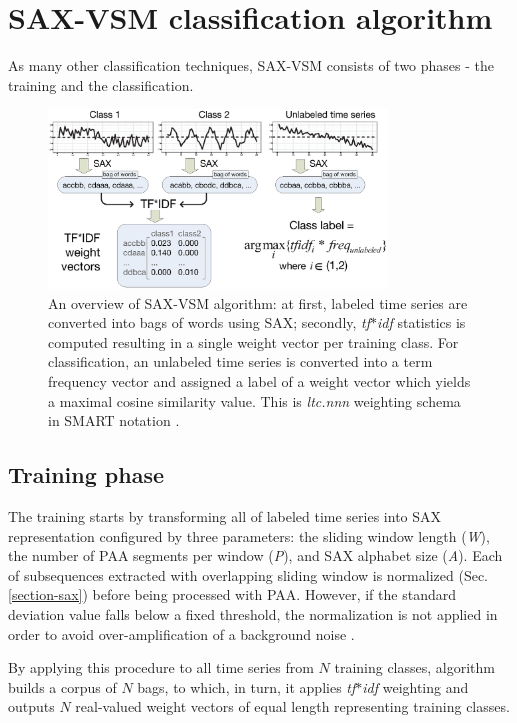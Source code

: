 \documentclass[conference]{IEEEtran}
\begin{document}
\vspace{0.1cm}
\section{SAX-VSM classification algorithm} \label{sax-vsm}
As many other classification techniques, SAX-VSM consists of two phases - 
the training and the classification. 

\begin{figure}[t]
   \centering
   \vspace{-0.05cm}
   \includegraphics[width=90mm]{figures/overview.eps}
   \caption{
   An overview of SAX-VSM algorithm: 
   at first, labeled time series are converted into bags of words using SAX; 
   secondly, \textit{tf$\ast$idf} statistics is computed resulting in 
   a single weight vector per training class. For classification, an unlabeled 
   time series is converted into a term frequency vector and assigned a 
   label of a weight vector which yields a maximal cosine similarity value.
   This is \textit{ltc.nnn} weighting schema in SMART notation \cite{logtf}.}
   \label{fig:overview}
   \vspace{-0.15cm}
\end{figure}

\subsection{Training phase}
The training starts by transforming all of labeled time series into SAX representation
configured by three parameters: the sliding window length (\textit{W}), 
the number of PAA segments per window (\textit{P}), 
and SAX alphabet size (\textit{A}).
Each of subsequences extracted with overlapping sliding window 
is normalized (Sec. \ref{section-sax}) before being processed with PAA. 
However, if the standard deviation value falls below a fixed threshold, the 
normalization is not applied in order to avoid over-amplification 
of a background noise \cite{sax}. 

By applying this procedure to all time series from $N$ training classes, 
algorithm builds a corpus of $N$ bags, to which, in turn, 
it applies \textit{tf$\ast$idf} weighting and outputs $N$ real-valued weight 
vectors of equal length representing training classes. 
\end{document}
